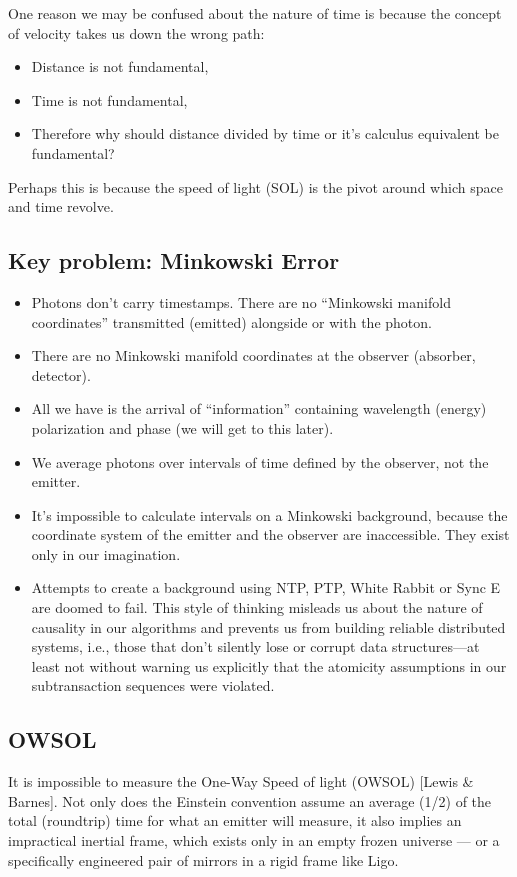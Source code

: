 One reason we may be confused about the nature of time is because the concept of velocity takes us down the wrong path:
\begin{itemize}
  \item Distance is not fundamental,
  \item Time is not fundamental,
  \item Therefore why should distance divided by time or it’s calculus equivalent  be fundamental?
\end{itemize}
Perhaps this is because the speed of light (SOL) is the pivot around which space and time revolve.


\subsection{Key problem: Minkowski Error}
\begin{itemize}
  \item Photons don’t carry timestamps. There are no “Minkowski manifold coordinates” transmitted (emitted) alongside or with the photon.
  \item There are no Minkowski manifold coordinates at the observer (absorber, detector).
  \item All we have is the arrival of “information” containing wavelength (energy) polarization and phase (we will get to this later). 
  \item We average photons over intervals of time defined by the observer, not the emitter. 
  \item It’s impossible to calculate intervals on a Minkowski background, because the coordinate system of the emitter and the observer are inaccessible. They exist only in our imagination.
  \item Attempts to create a background using NTP, PTP, White Rabbit or Sync E are doomed to fail. This style of thinking misleads us about the nature of causality in our algorithms and prevents us from building reliable distributed systems, i.e., those that don’t silently lose or corrupt data structures—at least not without warning us explicitly that the atomicity assumptions in our subtransaction sequences were violated. 
\end{itemize}


\subsection{OWSOL}
It is impossible to measure the One-Way Speed of light (OWSOL) [Lewis \& Barnes]. Not only does the Einstein convention assume an average (1/2) of the total (roundtrip) time for what an emitter will measure, it also implies an impractical inertial frame, which exists only in an empty frozen universe — or a specifically engineered pair of mirrors in a rigid frame like Ligo.

